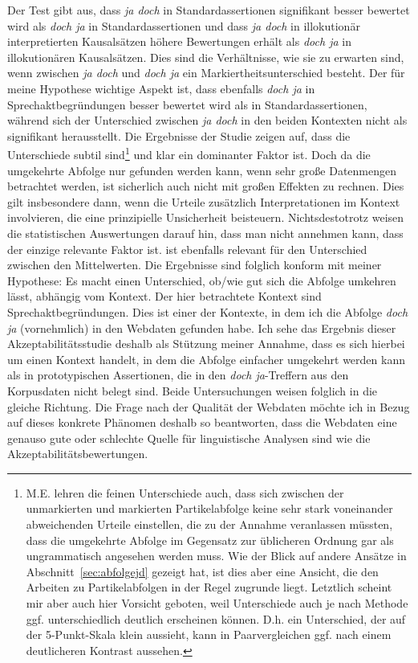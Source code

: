 Der Test gibt aus, dass \textit{ja doch} in Standardassertionen signifikant besser be\-wertet wird als \textit{doch ja} in Standardassertionen und dass \textit{ja doch} in illokutionär interpretierten Kausalsätzen höhere Bewertungen erhält als \textit{doch ja} in illokutionären Kausalsätzen. Dies sind die Verhältnisse, wie sie zu erwarten sind, wenn zwischen \textit{ja doch} und \textit{doch ja} ein Markiertheitsunterschied  besteht. Der für meine Hypothese wichtige Aspekt ist, dass ebenfalls \textit{doch ja} in Sprechaktbegründungen  besser bewertet wird als in  Standardassertionen, während sich der Unterschied zwischen \textit{ja doch} in den beiden Kontexten nicht als signifikant herausstellt. Die Ergebnisse der Studie zeigen auf, dass die Unterschiede subtil sind\footnote{M.E. lehren die feinen Unterschiede auch, dass sich zwischen der unmarkierten und markierten Partikelabfolge keine sehr stark voneinander abweichenden Urteile einstellen, die zu der Annahme veranlassen müssten, dass die umgekehrte Abfolge im Gegensatz zur üblicheren Ordnung gar als ungrammatisch angesehen werden muss. Wie der Blick auf andere Ansätze in Abschnitt~\ref{sec:abfolgejd} gezeigt hat, ist dies aber eine Ansicht, die den Arbeiten zu Partikelabfolgen in der Regel zugrunde liegt. Letztlich scheint mir aber auch hier Vorsicht geboten, weil Unterschiede auch je nach Methode ggf. unterschiedlich deutlich erscheinen können. D.h. ein Unterschied, der auf der 5-Punkt-Skala klein aussieht, kann in Paarvergleichen ggf. nach einem deutlicheren Kontrast aussehen.} und    klar ein dominanter Faktor ist. Doch da die umgekehrte Abfolge nur gefunden werden kann, wenn sehr große Datenmengen betrachtet werden, ist sicherlich auch nicht mit großen Effekten zu rechnen. Dies gilt insbesondere dann, wenn die Urteile zusätzlich Interpretationen im Kontext involvieren, die eine prinzi\-pielle Unsicherheit beisteuern. Nichtsdestotrotz weisen die statistischen Auswertungen darauf hin, dass man nicht annehmen kann, dass    der einzige relevante Faktor ist.   ist ebenfalls relevant für den Unterschied zwischen den Mittelwerten. Die Ergebnisse sind folglich konform mit meiner Hypothese: Es macht einen Unterschied, ob/wie gut sich die Abfolge umkehren lässt, abhängig vom Kontext. Der hier betrachtete Kontext sind Sprechaktbegründungen. Dies ist einer der Kontexte, in dem ich die Abfolge \textit{doch ja} (vornehmlich) in den Webdaten gefunden habe. Ich sehe das Ergebnis dieser Akzeptabilitätsstudie deshalb als Stützung meiner Annahme, dass es sich hierbei um einen Kontext handelt, in dem die Abfolge einfacher umgekehrt werden kann als in  prototypischen Assertionen, die in den \textit{doch ja}-Treffern aus den Korpusdaten nicht belegt sind. Beide Untersuchungen weisen folglich in die gleiche Richtung. Die Frage nach der Qualität der Webdaten möchte ich in Bezug auf dieses konkrete Phänomen deshalb so beantworten, dass die Webdaten eine genauso gute oder schlechte Quelle für linguistische Analysen sind wie die Akzeptabilitätsbewertungen.\pagebreak 

